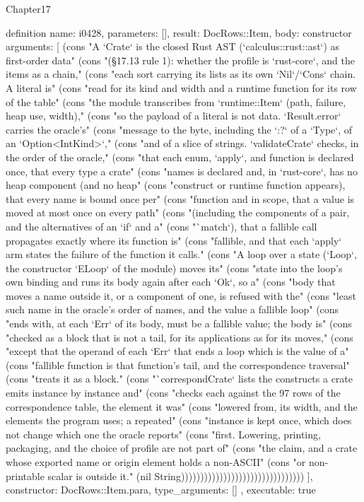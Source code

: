 \begin{lexlean}{Chapter17}
\begin{semanticmodule}
definition{
  name: i0428,
  parameters: [],
  result: DocRows::Item,
  body: constructor{
    arguments: [
      (cons "A `Crate` is the closed Rust AST (`calculus::rust::ast`) as first-order data" (cons "(§17.13 rule 1): whether the profile is `rust-core`, and the items as a chain," (cons "each sort carrying its lists as its own `Nil`/`Cons` chain. A literal is" (cons "read for its kind and width and a runtime function for its row of the table" (cons "the module transcribes from `runtime::Item` (path, failure, heap use, width)," (cons "so the payload of a literal is not data. `Result.error` carries the oracle's" (cons "message to the byte, including the `{:?}` of a `Type`, of an `Option<IntKind>`," (cons "and of a slice of strings. `validateCrate` checks, in the order of the oracle," (cons "that each enum, `apply`, and function is declared once, that every type a crate" (cons "names is declared and, in `rust-core`, has no heap component (and no heap" (cons "construct or runtime function appears), that every name is bound once per" (cons "function and in scope, that a value is moved at most once on every path" (cons "(including the components of a pair, and the alternatives of an `if` and a" (cons "`match`), that a fallible call propagates exactly where its function is" (cons "fallible, and that each `apply` arm states the failure of the function it calls." (cons "A loop over a state (`Loop`, the constructor `ELoop` of the module) moves its" (cons "state into the loop's own binding and runs its body again after each `Ok`, so a" (cons "body that moves a name outside it, or a component of one, is refused with the" (cons "least such name in the oracle's order of names, and the value a fallible loop" (cons "ends with, at each `Err` of its body, must be a fallible value; the body is" (cons "checked as a block that is not a tail, for its applications as for its moves," (cons "except that the operand of each `Err` that ends a loop which is the value of a" (cons "fallible function is that function's tail, and the correspondence traversal" (cons "treats it as a block." (cons "`correspondCrate` lists the constructs a crate emits instance by instance and" (cons "checks each against the 97 rows of the correspondence table, the element it was" (cons "lowered from, its width, and the elements the program uses; a repeated" (cons "instance is kept once, which does not change which one the oracle reports" (cons "first. Lowering, printing, packaging, and the choice of profile are not part of" (cons "the claim, and a crate whose exported name or origin element holds a non-ASCII" (cons "or non-printable scalar is outside it." (nil String))))))))))))))))))))))))))))))))
    ],
    constructor: DocRows::Item.para,
    type_arguments: []
  },
  executable: true
}


\end{semanticmodule}
\end{lexlean}
